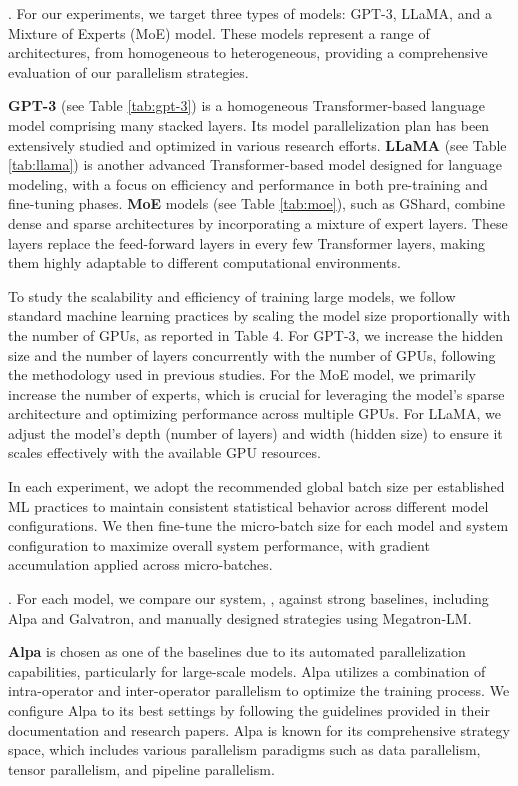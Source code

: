 .
For our experiments, we target three types of models: GPT-3, LLaMA, and a Mixture of Experts (MoE) model. These models represent a range of architectures, from homogeneous to heterogeneous, providing a comprehensive evaluation of our parallelism strategies. 

\par \textbf{GPT-3} (see Table \ref{tab:gpt-3}) is a homogeneous Transformer-based language model comprising many stacked layers. Its model parallelization plan has been extensively studied and optimized in various research efforts. \textbf{LLaMA} (see Table \ref{tab:llama}) is another advanced Transformer-based model designed for language modeling, with a focus on efficiency and performance in both pre-training and fine-tuning phases. \textbf{MoE} models (see Table \ref{tab:moe}), such as GShard, combine dense and sparse architectures by incorporating a mixture of expert layers. These layers replace the feed-forward layers in every few Transformer layers, making them highly adaptable to different computational environments.

\par To study the scalability and efficiency of training large models, we follow standard machine learning practices by scaling the model size proportionally with the number of GPUs, as reported in Table 4. For GPT-3, we increase the hidden size and the number of layers concurrently with the number of GPUs, following the methodology used in previous studies. For the MoE model, we primarily increase the number of experts, which is crucial for leveraging the model's sparse architecture and optimizing performance across multiple GPUs. For LLaMA, we adjust the model's depth (number of layers) and width (hidden size) to ensure it scales effectively with the available GPU resources.

\par In each experiment, we adopt the recommended global batch size per established ML practices to maintain consistent statistical behavior across different model configurations. We then fine-tune the micro-batch size for each model and system configuration to maximize overall system performance, with gradient accumulation applied across micro-batches.

. For each model, we compare our system, \sysname, against strong baselines, including Alpa and Galvatron, and manually designed strategies using Megatron-LM.

\par \textbf{Alpa} is chosen as one of the baselines due to its automated parallelization capabilities, particularly for large-scale models. Alpa utilizes a combination of intra-operator and inter-operator parallelism to optimize the training process. We configure Alpa to its best settings by following the guidelines provided in their documentation and research papers. Alpa is known for its comprehensive strategy space, which includes various parallelism paradigms such as data parallelism, tensor parallelism, and pipeline parallelism.

